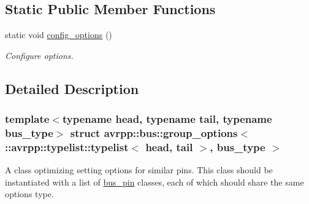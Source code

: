 \subsection*{Static Public Member Functions}
\begin{DoxyCompactItemize}
\item 
static void \hyperlink{structavrpp_1_1bus_1_1group__options_3_01_1_1avrpp_1_1typelist_1_1typelist_3_01head_00_01tail_01_4_00_01bus__type_01_4_adb02572f724b1c375893102168dcb1df}{config\_\-options} ()
\begin{DoxyCompactList}\small\item\em Configure options. \item\end{DoxyCompactList}\end{DoxyCompactItemize}


\subsection{Detailed Description}
\subsubsection*{template$<$typename head, typename tail, typename bus\_\-type$>$ struct avrpp::bus::group\_\-options$<$ ::avrpp::typelist::typelist$<$ head, tail $>$, bus\_\-type $>$}

A class optimizing setting options for similar pins. This class should be instantiated with a list of \hyperlink{structavrpp_1_1bus_1_1bus__pin}{bus\_\-pin} classes, each of which should share the same options type. 

